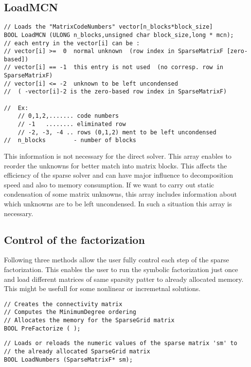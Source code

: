 \documentclass[12pt]{article}
\begin{document}
\subsection{LoadMCN}
\begin{verbatim}
// Loads the "MatrixCodeNumbers" vector[n_blocks*block_size]
BOOL LoadMCN (ULONG n_blocks,unsigned char block_size,long * mcn);
// each entry in the vector[i] can be :
// vector[i] >=  0  normal unknown	(row index in SparseMatrixF [zero-based])
// vector[i] == -1  this entry is not used	(no corresp. row in SparseMatrixF)
// vector[i] <= -2  unknown to be left uncondensed	
//	( -vector[i]-2 is the zero-based row index in SparseMatrixF)

//  Ex:
	// 0,1,2,....... code numbers
	// -1   ........ eliminated row
	// -2, -3, -4 .. rows (0,1,2) ment to be left uncondensed 
//  n_blocks		- number of blocks
\end{verbatim}
This information is not necessary for the direct solver. This array enables to reorder the unknowns for better match into matrix blocks. This affects the efficiency of the sparse solver and can have major influence to decomposition speed and also to memory consumption. 
If we want to carry out static condensation of some matrix unknowns, this array includes information about which unknowns are to be left uncondensed. In such a situation this array is necessary.

\subsection{Control of the factorization}

Following three methods allow the user fully control each step of the sparse factorization. This enables the user to run the symbolic factorization just once and load different matrices of same sparsity patter to already allocated memory. This might be usefull for some nonlinear or incremetnal solutions.

\begin{verbatim}
// Creates the connectivity matrix 
// Computes the MinimumDegree ordering
// Allocates the memory for the SparseGrid matrix
BOOL PreFactorize ( );
\end{verbatim}

\begin{verbatim}
// Loads or reloads the numeric values of the sparse matrix 'sm' to 
// the already allocated SparseGrid matrix 
BOOL LoadNumbers (SparseMatrixF* sm);
\end{verbatim}
\end{document}
